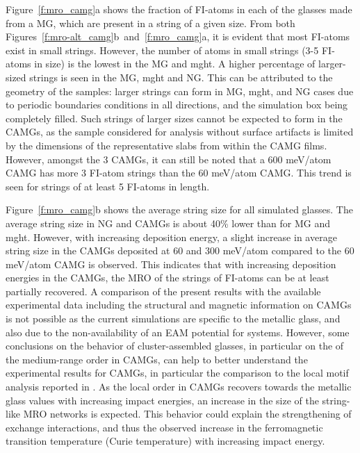 \begin{selfcite}
Figure~\ref{f:mro_camg}a shows the fraction of FI-atoms in each of the glasses made from a  MG, which are present in a string of a given size. From both Figures~\ref{f:mro-alt_camg}b~and~\ref{f:mro_camg}a, it is evident that most FI-atoms exist in small strings. However, the number of atoms in small strings (3-5 FI-atoms in size) is the lowest in the MG and \gls{mght}. A higher percentage of larger-sized strings is seen in the MG, \gls{mght} and NG. This can be attributed to the geometry of the samples: larger strings can form in MG, \gls{mght}, and NG cases due to periodic boundaries conditions in all directions, and the simulation box being completely filled. Such strings of larger sizes cannot be expected to form in the CAMGs, as the sample considered for analysis without surface artifacts is limited by the dimensions of the representative slabs from within the CAMG films. However, amongst the 3 CAMGs, it can still be noted that a 600 meV/atom CAMG has more 3 FI-atom strings than the 60 meV/atom CAMG. This trend is seen for strings of at least 5 FI-atoms in length. \par

Figure~\ref{f:mro_camg}b shows the average string size for all simulated glasses. The average string size in NG and CAMGs is about 40\% lower than for MG and \gls{mght}. However, with increasing deposition energy, a slight increase in average string size in the CAMGs deposited at 60 and 300 meV/atom compared to the 60 meV/atom CAMG is observed. This indicates that with increasing deposition energies in the CAMGs, the MRO of the strings of FI-atoms can be at least partially recovered. A comparison of the present results with the available experimental data including the structural and magnetic information on \fs CAMGs is not possible as the current simulations are specific to the \cz metallic glass, and also due to the non-availability of an EAM potential for \fs systems. However, some conclusions on the behavior of cluster-assembled glasses, in particular on the of the medium-range order in CAMGs, can help to better understand the experimental results for \fs CAMGs, in particular the comparison to the local motif analysis reported in \cite{Benel2019}. As the local order in CAMGs recovers towards the metallic glass values with increasing impact energies, an increase in the size of the string-like MRO networks is expected. This behavior could explain the strengthening of exchange interactions, and thus the observed increase in the ferromagnetic transition temperature (Curie temperature) with increasing impact energy. \par


\end{selfcite}
